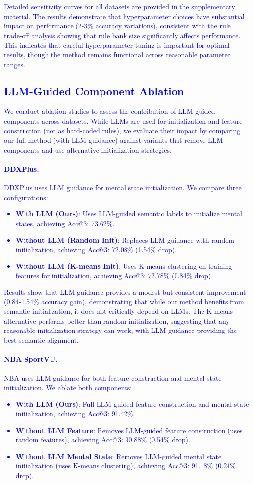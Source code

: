 \documentclass{article} %
\newcommand{\revise}[1]{\textcolor{blue}{#1}}
\begin{document}
\revise{Detailed sensitivity curves for all datasets are provided in the supplementary material. The results demonstrate that hyperparameter choices have substantial impact on performance (2-3\% accuracy variations), consistent with the rule trade-off analysis showing that rule bank size significantly affects performance. This indicates that careful hyperparameter tuning is important for optimal results, though the method remains functional across reasonable parameter ranges.}
\revise{\subsection{LLM-Guided Component Ablation}
\label{Sec:D4}
We conduct ablation studies to assess the contribution of LLM-guided components across datasets. While LLMs are used for initialization and feature construction (not as hard-coded rules), we evaluate their impact by comparing our full method (with LLM guidance) against variants that remove LLM components and use alternative initialization strategies.}
\revise{\paragraph{DDXPlus.}
DDXPlus uses LLM guidance for mental state initialization. We compare three configurations:
\begin{itemize}
    \item \textbf{With LLM (Ours)}: Uses LLM-guided semantic labels to initialize mental states, achieving Acc@3: 73.62\%.
    \item \textbf{Without LLM (Random Init)}: Replaces LLM guidance with random initialization, achieving Acc@3: 72.08\% (1.54\% drop).
    \item \textbf{Without LLM (K-means Init)}: Uses K-means clustering on training features for initialization, achieving Acc@3: 72.78\% (0.84\% drop).
\end{itemize}}
\revise{Results show that LLM guidance provides a modest but consistent improvement (0.84-1.54\% accuracy gain), demonstrating that while our method benefits from semantic initialization, it does not critically depend on LLMs. The K-means alternative performs better than random initialization, suggesting that any reasonable initialization strategy can work, with LLM guidance providing the best semantic alignment.}
\revise{\paragraph{NBA SportVU.}
NBA uses LLM guidance for both feature construction and mental state initialization. We ablate both components:
\begin{itemize}
    \item \textbf{With LLM (Ours)}: Full LLM-guided feature construction and mental state initialization, achieving Acc@3: 91.42\%.
    \item \textbf{Without LLM Feature}: Removes LLM-guided feature construction (uses random features), achieving Acc@3: 90.88\% (0.54\% drop).
    \item \textbf{Without LLM Mental State}: Removes LLM-guided mental state initialization (uses K-means clustering), achieving Acc@3: 91.18\% (0.24\% drop).
\end{itemize}}
\end{document}
